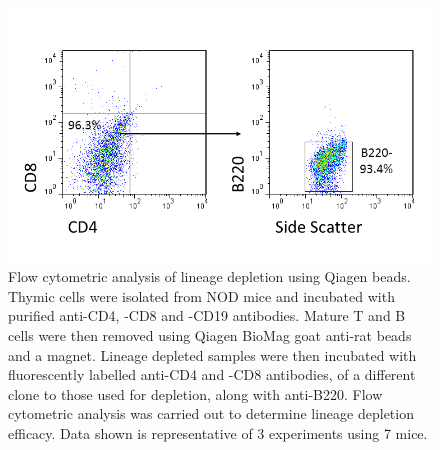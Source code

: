 \begin{figure}
\includegraphics[width=\textwidth]{Figures/Qiagenbeads.png}
\caption[Flow cytometric analysis of lineage depletion using Qiagen beads]{Flow cytometric analysis of lineage depletion using Qiagen beads.
Thymic cells were isolated from NOD mice and incubated with purified anti-CD4, -CD8 and -CD19 antibodies.
Mature T and B cells were then removed using Qiagen BioMag goat anti-rat beads and a magnet.
Lineage depleted samples were then incubated with fluorescently labelled anti-CD4 and -CD8 antibodies, of a different clone to those used for depletion, along with anti-B220.
Flow cytometric analysis was carried out to determine lineage depletion efficacy.
Data shown is representative of 3 experiments using 7 mice.}
\label{fig:Qiagenbeads}
\end{figure}

	
	
	
